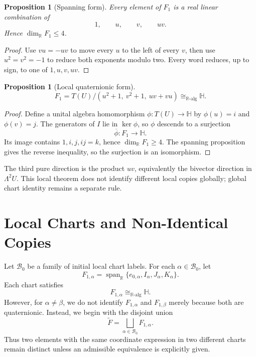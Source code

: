 \documentclass[11pt]{article}
\newtheorem{proposition}[definition]{Proposition}
\begin{document}
\begin{proposition}[Spanning form]
Every element of $F_1$ is a real linear combination of
\[
1,\qquad u,\qquad v,\qquad uv.
\]
Hence $\dim_{\mathbb R}F_1\le4$.
\end{proposition}

\begin{proof}
Use $vu=-uv$ to move every $u$ to the left of every $v$, then use
$u^2=v^2=-1$ to reduce both exponents modulo two. Every word reduces, up to
sign, to one of $1,u,v,uv$.
\end{proof}

\begin{proposition}[Local quaternionic form]
\[
\boxed{
F_1=T(U)/(u^2+1,\ v^2+1,\ uv+vu)
\cong_{\mathbb R\text{-alg}}\mathbb H.
}
\]
\end{proposition}

\begin{proof}
Define a unital algebra homomorphism $\phi:T(U)\to\mathbb H$ by
$\phi(u)=i$ and $\phi(v)=j$. The generators of $I$ lie in $\ker\phi$, so
$\phi$ descends to a surjection
\[
\overline\phi:F_1\longrightarrow\mathbb H.
\]
Its image contains $1,i,j,ij=k$, hence $\dim_{\mathbb R}F_1\ge4$.
The spanning proposition gives the reverse inequality, so the surjection is an
isomorphism.
\end{proof}

The third pure direction is the product $uv$, equivalently the bivector
direction in $\Lambda^2U$. This local theorem does not identify different
local copies globally; global chart identity remains a separate rule.

\section{Local Charts and Non-Identical Copies}

Let $\mathcal B_0$ be a family of initial local chart labels. For each $\alpha\in\mathcal B_0$, let
\[
F_{1,\alpha}=\operatorname{span}_{\mathbb R}\{e_{0,\alpha},I_\alpha,J_\alpha,K_\alpha\}.
\]
Each chart satisfies
\[
F_{1,\alpha}\cong_{\mathbb R\text{-alg}}\mathbb H.
\]
However, for $\alpha\neq\beta$, we do not identify $F_{1,\alpha}$ and $F_{1,\beta}$ merely because both are quaternionic. Instead, we begin with the disjoint union
\[
\widetilde F=\bigsqcup_{\alpha\in\mathcal B_0}F_{1,\alpha}.
\]
Thus two elements with the same coordinate expression in two different charts remain distinct unless an admissible equivalence is explicitly given.
\end{document}
